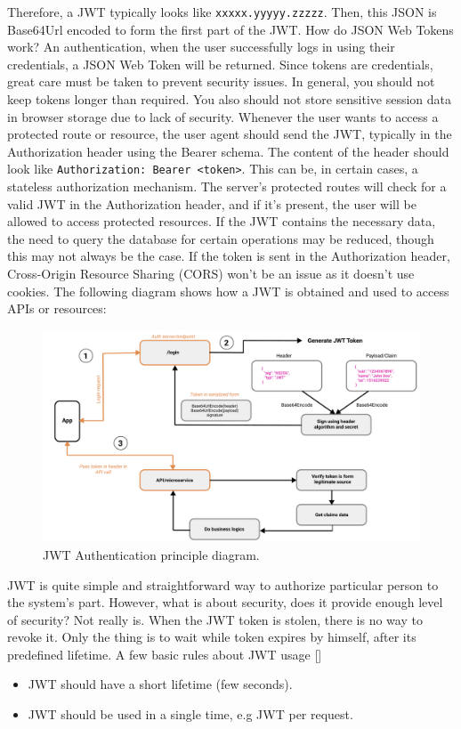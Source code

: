 Therefore, a JWT typically looks like \texttt{xxxxx.yyyyy.zzzzz}.
Then, this JSON is Base64Url encoded to form the first part of the JWT\@.
How do JSON Web Tokens work?
An authentication, when the user successfully logs in using their credentials, a JSON Web Token will be returned.
Since tokens are credentials, great care must be taken to prevent security issues.
In general, you should not keep tokens longer than required.
You also should not store sensitive session data in browser storage due to lack of security.
Whenever the user wants to access a protected route or resource, the user agent should send the JWT,
typically in the Authorization header using the Bearer schema.
The content of the header should look like \texttt{Authorization: Bearer <token>}.
This can be, in certain cases, a stateless authorization mechanism.
The server's protected routes will check for a valid JWT in the Authorization header, and if it's present, the user
will be allowed to access protected resources.
If the JWT contains the necessary data, the need to query the database for certain operations may be reduced, though
this may not always be the case.
If the token is sent in the Authorization header, Cross-Origin Resource Sharing (CORS) won't be an issue as it doesn't
use cookies.
The following diagram shows how a JWT is obtained and used to access APIs or resources:
\begin{figure}[H]
    \centering
    \includegraphics[width=1\textwidth]{Pictures/jwt_auth_scheme.pdf}
    \caption{JWT Authentication principle diagram.}\label{fig:figure3}
\end{figure}
JWT is quite simple and straightforward way to authorize particular person to the system's part.
However, what is about security, does it provide enough level of security?
Not really is.
When the JWT token is stolen, there is no way to revoke it.
Only the thing is to wait while token expires by himself, after its predefined lifetime.
A few basic rules about JWT usage [\cite{RDegges}]
\begin{itemize}
    \item JWT should have a short lifetime (few seconds).
    \item JWT should be used in a single time, e.g JWT per request.
\end{itemize}